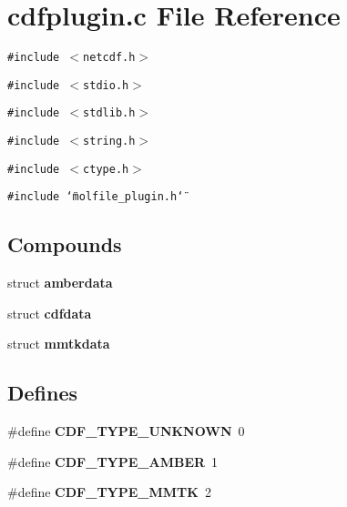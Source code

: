 \section{cdfplugin.c File Reference}
\label{cdfplugin_8c}
{\tt \#include $<$netcdf.h$>$}\par
{\tt \#include $<$stdio.h$>$}\par
{\tt \#include $<$stdlib.h$>$}\par
{\tt \#include $<$string.h$>$}\par
{\tt \#include $<$ctype.h$>$}\par
{\tt \#include \char`\"{}molfile\_\-plugin.h\char`\"{}}\par
\subsection*{Compounds}
\begin{CompactItemize}
\item 
struct {\bf amberdata}
\item 
struct {\bf cdfdata}
\item 
struct {\bf mmtkdata}
\end{CompactItemize}
\subsection*{Defines}
\begin{CompactItemize}
\item 
\#define {\bf CDF\_\-TYPE\_\-UNKNOWN}\ 0
\item 
\#define {\bf CDF\_\-TYPE\_\-AMBER}\ 1
\item 
\#define {\bf CDF\_\-TYPE\_\-MMTK}\ 2
\end{CompactItemize}

